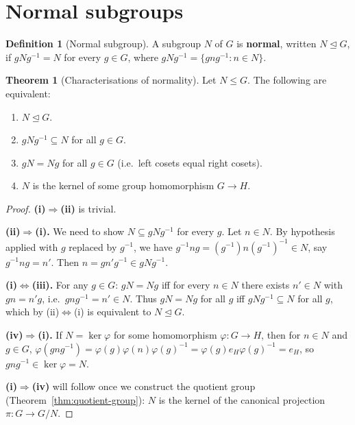\documentclass[12pt,a4paper,openany]{book}
\theoremstyle{definition}
\newtheorem{definition}{Definition}[chapter]
\newtheorem{theorem}{Theorem}[chapter]
\theoremstyle{remark}
\begin{document}
\section{Normal subgroups}
\label{sec:ch2-normal}

\begin{definition}[Normal subgroup]
\label{def:normal-subgroup}
A subgroup $N$ of $G$ is \textbf{normal}, written $N\trianglelefteq
G$, if $gNg^{-1}=N$ for every
$g\in G$, where $gNg^{-1}=\{gng^{-1}:n\in N\}$.
\end{definition}

\begin{theorem}[Characterisations of normality]
\label{thm:normal-characterisations}
Let $N\le G$.  The following are equivalent:
\begin{enumerate}[label=(\roman*)]
  \item $N\trianglelefteq G$.
  \item $gNg^{-1}\subseteq N$ for all $g\in G$.
  \item $gN=Ng$ for all $g\in G$ (i.e.\ left cosets equal right cosets).
  \item $N$ is the kernel of some group homomorphism $G\to H$.
\end{enumerate}
\end{theorem}

\begin{proof}
\textbf{(i)$\Rightarrow$(ii)} is trivial.

\textbf{(ii)$\Rightarrow$(i).}  We need to show $N\subseteq gNg^{-1}$ for
every $g$.  Let $n\in N$.  By hypothesis applied with $g$ replaced by
$g^{-1}$, we have $g^{-1}ng=(g^{-1})n(g^{-1})^{-1}\in N$, say
$g^{-1}ng=n'$.  Then $n=gn'g^{-1}\in gNg^{-1}$.

\textbf{(i)$\Leftrightarrow$(iii).}  For any $g\in G$:
$gN=Ng$ iff for every $n\in N$ there exists $n'\in N$ with $gn=n'g$, i.e.\
$gng^{-1}=n'\in N$.  Thus $gN=Ng$ for all $g$ iff $gNg^{-1}\subseteq N$
for all $g$, which by (ii)$\Leftrightarrow$(i) is equivalent to
$N\trianglelefteq G$.

\textbf{(iv)$\Rightarrow$(i).}  If $N=\ker\varphi$ for some homomorphism
$\varphi\colon G\to H$, then for $n\in N$ and $g\in G$,
$\varphi(gng^{-1})=\varphi(g)\varphi(n)\varphi(g)^{-1}=
\varphi(g)e_H\varphi(g)^{-1}=e_H$, so $gng^{-1}\in\ker\varphi=N$.

\textbf{(i)$\Rightarrow$(iv)} will follow once we construct the quotient
group (Theorem~\ref{thm:quotient-group}): $N$ is the kernel of the
canonical projection $\pi\colon G\to G/N$.
\end{proof}
\end{document}
